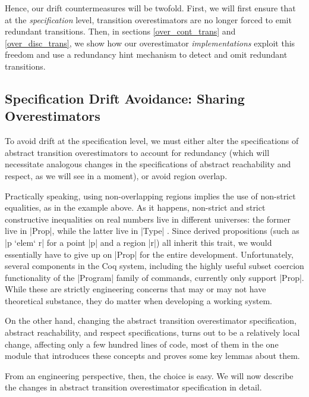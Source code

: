 \documentclass[runningheads]{llncs}
\begin{document}
Hence, our drift countermeasures will be twofold. First, we will first ensure that at the \emph{specification} level, transition overestimators are no longer forced to emit redundant transitions. Then, in sections \ref{over_cont_trans} and \ref{over_disc_trans}, we show how our overestimator \emph{implementations} exploit this freedom and use a redundancy hint mechanism to detect and omit redundant transitions.


\subsection{Specification Drift Avoidance: Sharing Overestimators}

To avoid drift at the specification level, we must either alter the specifications of abstract transition overestimators to account for redundancy (which will necessitate analogous changes in the specifications of abstract reachability and respect, as we will see in a moment), or avoid region overlap.

Practically speaking, using non-overlapping regions implies the use of non-strict equalities, as in the example above. As it happens, non-strict and strict constructive inequalities on real numbers live in different universes: the former live in |Prop|, while the latter live in |Type| . Since derived propositions (such as |p `elem` r| for a point |p| and a region |r|) all inherit this trait, we would essentially have to give up on |Prop| for the entire development. Unfortunately, several components in the Coq system, including the highly useful subset coercion functionality of the |Program| family of commands, currently only support |Prop|. While these are strictly engineering concerns that may or may not have theoretical substance, they do matter when developing a working system.

On the other hand, changing the abstract transition overestimator specification, abstract reachability, and respect specifications, turns out to be a relatively local change, affecting only a few hundred lines of code, most of them in the one module that introduces these concepts and proves some key lemmas about them.

From an engineering perspective, then, the choice is easy. We will now describe the changes in abstract transition overestimator specification in detail.
\end{document}

